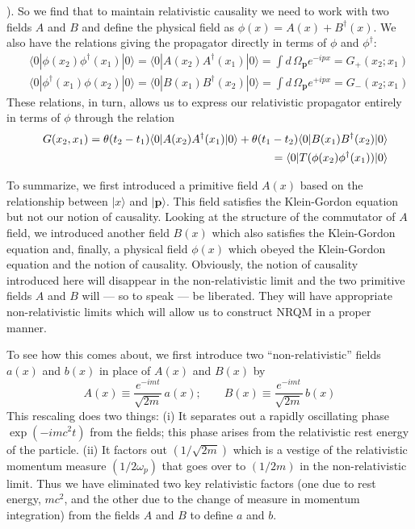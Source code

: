 \documentclass{article}
\def\ket#1{|#1\rangle}                    %
\def\bk#1#2#3{{\langle #1|#2|#3\rangle}}  %
\begin{document}
). 
So we find that to maintain relativistic causality we need to work with two fields $A$ and $B$ and define the physical field as $
 \phi(x) = A(x) + B^\dagger(x)
$.
We also have the relations giving the propagator directly in terms of $\phi$ and $\phi^\dagger$:
  \begin{eqnarray}
 &&\bk{0} {\phi(x_2) \phi^\dagger(x_1)}{0} =\bk{0} {A(x_2) A^\dagger(x_1)}{0}
 = \int d\,\Omega_{\bm{p}} e^{-ipx} = G_+(x_2;x_1) \nonumber\\
&&\bk{0} {\phi^\dagger(x_1) \phi(x_2)}{0} = \bk{0} {B(x_1) B^\dagger(x_2)}{0}
=\int d\,\Omega_{\bm{p}} e^{+ipx} = G_-(x_2;x_1)
\label{fieldexps}
\end{eqnarray} 
  These relations, in turn, allows us to express our relativistic propagator  entirely in terms of $\phi$ through the relation 
\begin{eqnarray}
 &&G(x_2,x_1) 
 =\theta(t_2-t_1) \bk{0}{A(x_2)A^\dagger(x_1)}{0} + \theta(t_1-t_2) \bk{0}{B(x_1)B^\dagger(x_2)}{0}\nonumber\\
 &&\hskip 5cm =  \bk{0}{T(\phi(x_2)\phi^\dagger(x_1))}{0}
 \label{conc1}
\end{eqnarray} 
 
 To summarize, we first introduced a primitive field $A(x)$  based on the relationship between 
  $\ket{x}$ and $\ket{\bm{p}}$. This field satisfies the Klein-Gordon equation but not our notion of causality. Looking at the structure of the commutator of $A$ field, we introduced another field $B(x)$ which also satisfies the Klein-Gordon equation and, finally, a physical field  $\phi(x)$ which obeyed the Klein-Gordon equation and the notion of causality. Obviously, the notion of causality introduced here will disappear in the non-relativistic limit and the two primitive fields $A$ and $B$ will --- so to speak --- be liberated. They will have appropriate non-relativistic limits which will allow us to construct NRQM in a proper manner. 

  To see how this comes about, we first introduce two  ``non-relativistic''  fields $a(x)$ and $b(x)$ in place of $A(x)$ and $B(x)$ by
  \begin{equation}
 A(x) \equiv \frac{e^{-imt}}{\sqrt{2m}} \, a(x); \qquad B(x)\equiv \frac{e^{-imt}}{\sqrt{2m}}\, b(x)
\end{equation} 
 This rescaling does two things: (i) It separates out a rapidly oscillating phase $\exp(-i mc^2t)$ from the fields; this phase arises from the relativistic rest energy of the particle. (ii) It factors out $(1/\sqrt{2m})$ which is a vestige of the relativistic momentum measure $(1/2\omega_p)$ that goes over to $(1/2m)$ in the non-relativistic limit. Thus we have eliminated two key relativistic factors (one due to rest energy, $mc^2$, and the other due to the change of measure in momentum integration) from the fields $A$ and $B$ to define $a$ and $b$. 
 
\end{document}
